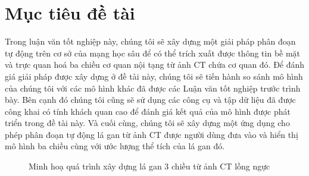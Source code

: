 \section{Mục tiêu đề tài}
Trong luận văn tốt nghiệp này, chúng tôi sẽ xây dựng một giải pháp phân đoạn tự động trên cơ sở của mạng học sâu để có thể trích xuất được thông tin bề mặt và trực quan hoá ba chiều cơ quan nội tạng từ ảnh CT chứa cơ quan đó. Để đánh giá giải pháp được xây dựng ở đề tài này, chúng tôi sẽ tiến hành so sánh mô hình của chúng tôi với các mô hình khác đã được các Luận văn tốt nghiệp trước trình bày. Bên cạnh đó chúng tôi cũng sẽ sử dụng các công cụ và tập dữ liệu đã được công khai có tính khách quan cao để đánh giá kết quả của mô hình được phát triển trong đề tài này. Và cuối cùng, chúng tôi sẽ xây dựng một ứng dụng cho phép phân đoạn tự động lá gan từ ảnh CT được người dùng đưa vào và hiển thị mô hình ba chiều cùng với ước lượng thể tích của lá gan đó.

\begin{figure}
  \centering
  \caption{Minh hoạ quá trình xây dựng lá gan 3 chiều từ ảnh CT lồng ngực}
  \label{fig:ab}
\end{figure}

